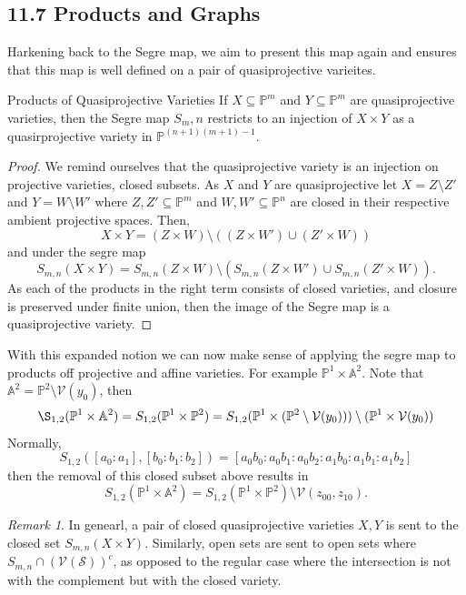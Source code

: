 \documentclass[40pt]{article}
\newcommand{\mcal}[1]{\mathcal{#1}}
\newcommand{\Proj}{\mathbb{P}}
\newcommand{\A}{\mathbb{A}}
\newcommand{\V}{\mathcal{V}}
\theoremstyle{remark}
\newtheorem{remark}[theorem]{Remark}
\begin{document}
			\subsection{11.7 Products and Graphs}
			Harkening back to the Segre map, we aim to present this map again and ensures that this map is well defined on a pair of quasiprojective varieites. 
			\begin{prop}{Products of Quasiprojective Varieties}
				If $X \subseteq \Proj^m$ and $Y\subseteq \Proj^m$ are quasiprojective varieties, then the Segre map $S_m,n$ restricts to an injection of $X \times Y$ as a quasirprojective variety in $\Proj^{(n+1)(m+1) - 1}$.
			\end{prop}
			\begin{proof}
				We remind ourselves that the quasiprojective variety is an injection on projective varieties, closed subsets. As $X$ and $Y$ are quasiprojective let $X = Z \setminus Z'$ and $Y = W \setminus W'$ where $Z,Z'\subseteq \Proj^m$ and $W,W' \subseteq \Proj^n$ are closed in their respective ambient projective spaces. Then, 
				\[
				X \times Y = (Z \times W) \setminus ((Z \times W') \cup (Z' \times W))
				\]
				and under the segre map 
				\[
				S_{m,n}(X \times Y) = S_{m,n}(Z \times W) \setminus (S_{m,n}(Z \times W') \cup S_{m,n}(Z' \times W)).
				\]
				As each of the products in the right term consists of closed varieties, and closure is preserved under finite union, then the image of the Segre map is a quasiprojective variety. 
			\end{proof}
			With this expanded notion we can now make sense of applying the segre map to products off projective and affine varieties. For example $\Proj^1 \times \A^2$.  Note that $\A^2 = \Proj^2 \setminus \V(y_0)$, then 
			\[
			\S_{1,2}(\Proj^1 \times \A^2) = S_{1,2}(\Proj^1 \times \Proj^2) = S_{1,2}(\Proj^1 \times( \Proj^2 \setminus \V(y_0))) \setminus (\Proj^1 \times \V(y_0))
			\]
			Normally, 
			\[
			S_{1,2}([a_0:a_1],[b_0:b_1:b_2]) = [a_0b_0:a_0b_1:a_0b_2:a_1b_0:a_1b_1:a_1b_2]
			\]
			then the removal of this closed subset above results in 
			\[
			S_{1,2}(\Proj^1 \times \A^2) = S_{1,2}(\Proj^1 \times \Proj^2) \setminus \V(z_{00}, z_{10}).
			\]
			\begin{remark}
				In genearl, a pair of closed quasiprojective varieties $X,Y$ is sent to the closed set $S_{m,n}(X\times Y)$. Similarly, open sets are sent to open sets where $S_{m,n} \cap (\V(\mcal{S}))^c$, as opposed to the regular case where the intersection is not with the complement but with the closed variety.
			\end{remark}
\end{document}
